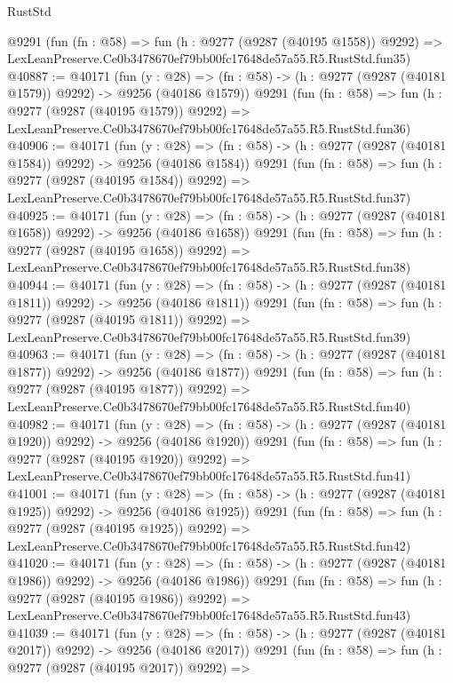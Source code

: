 \begin{lexlean}{RustStd}
\begin{coremodule}
    @9291
    (fun (fn : @58) =>
    fun (h : @9277 (@9287 (@40195 @1558)) @9292) =>
    LexLeanPreserve.Ce0b3478670ef79bb00fc17648de57a55.R5.RustStd.fun35)
@40887 := @40171
    (fun (y : @28) =>
    (fn : @58) -> (h : @9277 (@9287 (@40181 @1579)) @9292) -> @9256 (@40186 @1579))
    @9291
    (fun (fn : @58) =>
    fun (h : @9277 (@9287 (@40195 @1579)) @9292) =>
    LexLeanPreserve.Ce0b3478670ef79bb00fc17648de57a55.R5.RustStd.fun36)
@40906 := @40171
    (fun (y : @28) =>
    (fn : @58) -> (h : @9277 (@9287 (@40181 @1584)) @9292) -> @9256 (@40186 @1584))
    @9291
    (fun (fn : @58) =>
    fun (h : @9277 (@9287 (@40195 @1584)) @9292) =>
    LexLeanPreserve.Ce0b3478670ef79bb00fc17648de57a55.R5.RustStd.fun37)
@40925 := @40171
    (fun (y : @28) =>
    (fn : @58) -> (h : @9277 (@9287 (@40181 @1658)) @9292) -> @9256 (@40186 @1658))
    @9291
    (fun (fn : @58) =>
    fun (h : @9277 (@9287 (@40195 @1658)) @9292) =>
    LexLeanPreserve.Ce0b3478670ef79bb00fc17648de57a55.R5.RustStd.fun38)
@40944 := @40171
    (fun (y : @28) =>
    (fn : @58) -> (h : @9277 (@9287 (@40181 @1811)) @9292) -> @9256 (@40186 @1811))
    @9291
    (fun (fn : @58) =>
    fun (h : @9277 (@9287 (@40195 @1811)) @9292) =>
    LexLeanPreserve.Ce0b3478670ef79bb00fc17648de57a55.R5.RustStd.fun39)
@40963 := @40171
    (fun (y : @28) =>
    (fn : @58) -> (h : @9277 (@9287 (@40181 @1877)) @9292) -> @9256 (@40186 @1877))
    @9291
    (fun (fn : @58) =>
    fun (h : @9277 (@9287 (@40195 @1877)) @9292) =>
    LexLeanPreserve.Ce0b3478670ef79bb00fc17648de57a55.R5.RustStd.fun40)
@40982 := @40171
    (fun (y : @28) =>
    (fn : @58) -> (h : @9277 (@9287 (@40181 @1920)) @9292) -> @9256 (@40186 @1920))
    @9291
    (fun (fn : @58) =>
    fun (h : @9277 (@9287 (@40195 @1920)) @9292) =>
    LexLeanPreserve.Ce0b3478670ef79bb00fc17648de57a55.R5.RustStd.fun41)
@41001 := @40171
    (fun (y : @28) =>
    (fn : @58) -> (h : @9277 (@9287 (@40181 @1925)) @9292) -> @9256 (@40186 @1925))
    @9291
    (fun (fn : @58) =>
    fun (h : @9277 (@9287 (@40195 @1925)) @9292) =>
    LexLeanPreserve.Ce0b3478670ef79bb00fc17648de57a55.R5.RustStd.fun42)
@41020 := @40171
    (fun (y : @28) =>
    (fn : @58) -> (h : @9277 (@9287 (@40181 @1986)) @9292) -> @9256 (@40186 @1986))
    @9291
    (fun (fn : @58) =>
    fun (h : @9277 (@9287 (@40195 @1986)) @9292) =>
    LexLeanPreserve.Ce0b3478670ef79bb00fc17648de57a55.R5.RustStd.fun43)
@41039 := @40171
    (fun (y : @28) =>
    (fn : @58) -> (h : @9277 (@9287 (@40181 @2017)) @9292) -> @9256 (@40186 @2017))
    @9291
    (fun (fn : @58) =>
    fun (h : @9277 (@9287 (@40195 @2017)) @9292) =>

\end{coremodule}
\end{lexlean}
